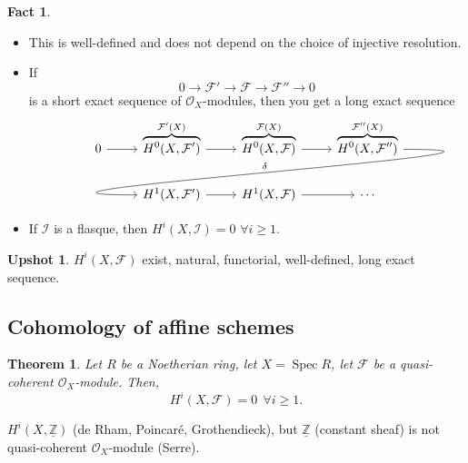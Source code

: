 \documentclass[12pt]{article}
\DeclareMathOperator{\Spec}{Spec}
\newtheorem*{theorem}{Theorem}
\theoremstyle{definition}
\newtheorem*{fact}{Fact}
\newtheorem*{upshot}{Upshot}
\begin{document}
\begin{fact}
\begin{itemize}[label=$-$]
\item This is well-defined and does not depend on the choice of injective resolution.
\item If
\[0\longrightarrow\mathcal{F}'\longrightarrow\mathcal{F}\longrightarrow\mathcal{F}''\longrightarrow0\]
is a short exact sequence of $\mathcal{O}_X$-modules, then you get a long exact sequence
\[
\begin{tikzcd}
0\arrow[r]&\overbrace{H^0(X,\mathcal{F}')}^{\mathcal{F}'(X)}\arrow[r]&\overbrace{H^0(X,\mathcal{F})}^{\mathcal{F}(X)}\arrow[r]&\overbrace{H^0(X,\mathcal{F}'')}^{\mathcal{F}''(X)}\arrow[out=0,in=180,looseness=2,overlay,lld,"\delta",swap]\\
&H^1(X,\mathcal{F}')\arrow[r]&H^1(X,\mathcal{F})\arrow[r]&\cdots
\end{tikzcd}
\]
\item If $\mathcal{I}$ is a flasque, then $H^i(X,\mathcal{I})=0$ $\forall i\geq1$.
\end{itemize}
\end{fact}

\begin{upshot}
$H^i(X,\mathcal{F})$ exist, natural, functorial, well-defined, long exact sequence.
\end{upshot}

\subsection*{Cohomology of affine schemes}
\begin{theorem}
Let $R$ be a Noetherian ring, let $X=\Spec R$, let $\mathcal{F}$ be a quasi-coherent $\mathcal{O}_X$-module. Then,
\[H^i(X,\mathcal{F})=0\ \ \forall i\geq1.\]
\end{theorem}

$H^i(X,\underline{\mathbb{Z}})$ (de Rham, Poincar\'{e}, Grothendieck), but $\underline{\mathbb{Z}}$ (constant sheaf) is not quasi-coherent $\mathcal{O}_X$-module (Serre).
\end{document}
